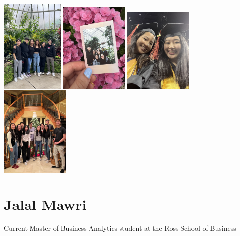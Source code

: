 \documentclass[
]{book}
\begin{document}
\includegraphics[width=0.23\textwidth,height=\textheight]{dtw.png}
\includegraphics[width=0.25\textwidth,height=\textheight]{belleisle.png}
\includegraphics[width=0.25\textwidth,height=\textheight]{econ.png}
\includegraphics[width=0.25\textwidth,height=\textheight]{christmas.JPG}

\hypertarget{jalal-mawri}{%
\section{Jalal Mawri}\label{jalal-mawri}}

Current Master of Business Analytics student at the Ross School of Business
\end{document}
